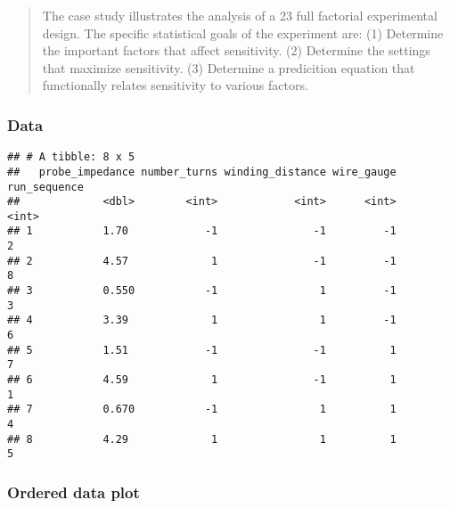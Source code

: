 \documentclass[]{book}
\newenvironment{Shaded}{\begin{snugshade}}{\end{snugshade}}
\newcommand{\DataTypeTok}[1]{\textcolor[rgb]{0.13,0.29,0.53}{#1}}
\newcommand{\DecValTok}[1]{\textcolor[rgb]{0.00,0.00,0.81}{#1}}
\newcommand{\KeywordTok}[1]{\textcolor[rgb]{0.13,0.29,0.53}{\textbf{#1}}}
\newcommand{\NormalTok}[1]{#1}
\newcommand{\OperatorTok}[1]{\textcolor[rgb]{0.81,0.36,0.00}{\textbf{#1}}}
\newcommand{\OtherTok}[1]{\textcolor[rgb]{0.56,0.35,0.01}{#1}}
\newcommand{\StringTok}[1]{\textcolor[rgb]{0.31,0.60,0.02}{#1}}
\theoremstyle{definition}
\theoremstyle{definition}
\theoremstyle{definition}
\theoremstyle{remark}
\begin{document}
\begin{quote}
The case study illustrates the analysis of a 23 full factorial
experimental design. The specific statistical goals of the experiment
are: (1) Determine the important factors that affect sensitivity. (2)
Determine the settings that maximize sensitivity. (3) Determine a
predicition equation that functionally relates sensitivity to various
factors.
\end{quote}

\hypertarget{data}{%
\subsubsection{Data}\label{data}}

\begin{Shaded}
\end{Shaded}

\begin{verbatim}
## # A tibble: 8 x 5
##   probe_impedance number_turns winding_distance wire_gauge run_sequence
##             <dbl>        <int>            <int>      <int>        <int>
## 1           1.70            -1               -1         -1            2
## 2           4.57             1               -1         -1            8
## 3           0.550           -1                1         -1            3
## 4           3.39             1                1         -1            6
## 5           1.51            -1               -1          1            7
## 6           4.59             1               -1          1            1
## 7           0.670           -1                1          1            4
## 8           4.29             1                1          1            5
\end{verbatim}

\hypertarget{ordered-data-plot}{%
\subsubsection{Ordered data plot}\label{ordered-data-plot}}
\end{document}
